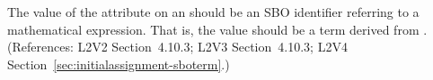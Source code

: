 The value of the  attribute on an \InitialAssignment should be an
SBO identifier referring to a mathematical expression.  That is, the value
should be a term derived from \sbomathformula.  (References: L2V2 Section~4.10.3;
L2V3 Section~4.10.3; L2V4 Section~\ref{sec:initialassignment-sboterm}.)
